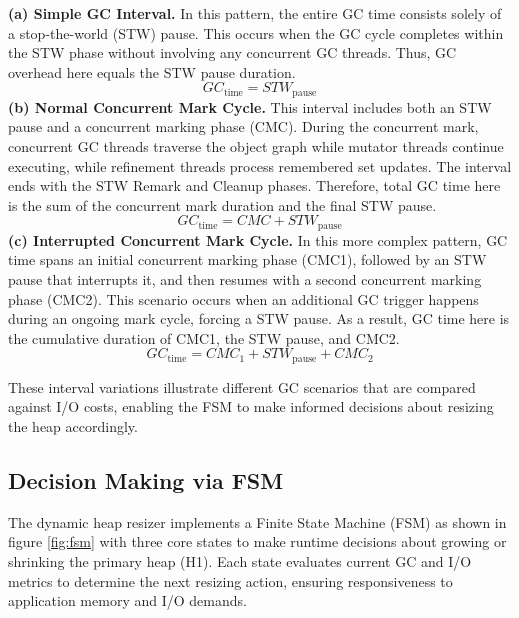 \textbf{(a) Simple GC Interval.} In this pattern, the entire GC time consists solely of a stop-the-world (STW) pause. This occurs when the GC cycle completes within the STW phase without involving any concurrent GC threads. Thus, GC overhead here equals the STW pause duration. 
\begin{equation}
GC_{\text{time}} = STW_{\text{pause}}
\end{equation}
\textbf{(b) Normal Concurrent Mark Cycle.} This interval includes both an STW pause and a concurrent marking phase (CMC). During the concurrent mark, concurrent GC threads traverse the object graph while mutator threads continue executing, while refinement threads process remembered set updates. The interval ends with the STW Remark and Cleanup phases. Therefore, total GC time here is the sum of the concurrent mark duration and the final STW pause.
\begin{equation}
GC_{\text{time}} = CMC + STW_{\text{pause}}
\end{equation}
\textbf{(c) Interrupted Concurrent Mark Cycle.} In this more complex pattern, GC time spans an initial concurrent marking phase (CMC1), followed by an STW pause that interrupts it, and then resumes with a second concurrent marking phase (CMC2). This scenario occurs when an additional GC trigger happens during an ongoing mark cycle, forcing a STW pause. As a result, GC time here is the cumulative duration of CMC1, the STW pause, and CMC2.
\begin{equation}
  GC_{\text{time}} = CMC_{\text{1}} + STW_{\text{pause}} + CMC_{\text{2}}
\end{equation}

These interval variations illustrate different GC scenarios that are compared against I/O costs, enabling the FSM to make informed decisions about resizing the heap accordingly.

\subsection{Decision Making via FSM}

The dynamic heap resizer implements a Finite State Machine (FSM)  as shown in figure \ref{fig:fsm} with three core states to make runtime decisions about growing or shrinking the primary heap (H1). Each state evaluates current GC and I/O metrics to determine the next resizing action, ensuring responsiveness to application memory and I/O demands.

